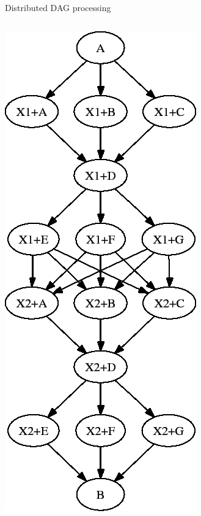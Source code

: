 \documentclass[aspectratio=169]{beamer}
\begin{document}
\begin{frame}{Distributed DAG processing}
\large
\vspace{0.5 cm}
\begin{columns}
\includegraphics[width=\linewidth]{dag-htcondor.png}


\end{columns}
\end{frame}
\end{document}
